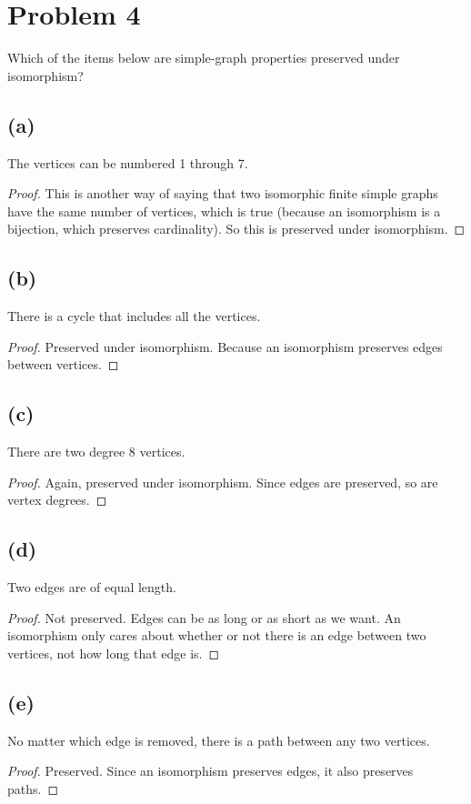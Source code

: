\documentclass[14pt]{extarticle}
\begin{document}
\section{Problem 4}
Which of the items below are simple-graph properties preserved under isomorphism?

\subsection{(a)}
The vertices can be numbered 1 through 7.
\begin{proof}
This is another way of saying that two isomorphic finite simple graphs have the same number of vertices, which is true (because an isomorphism is a bijection, which preserves cardinality). So this is preserved under isomorphism.
\end{proof}

\subsection{(b)}
There is a cycle that includes all the vertices.
\begin{proof}
Preserved under isomorphism. Because an isomorphism preserves edges between vertices.
\end{proof}

\subsection{(c)}
There are two degree 8 vertices.
\begin{proof}
Again, preserved under isomorphism. Since edges are preserved, so are vertex degrees.
\end{proof}

\subsection{(d)}
Two edges are of equal length.
\begin{proof}
Not preserved. Edges can be as long or as short as we want. An isomorphism only cares about whether or not there is an edge between two vertices, not how long that edge is.
\end{proof}

\subsection{(e)}
No matter which edge is removed, there is a path between any two vertices.
\begin{proof}
Preserved. Since an isomorphism preserves edges, it also preserves paths.
\end{proof}
\end{document}
